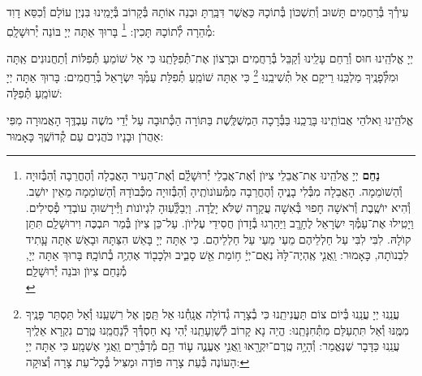 \documentclass[twoside, openany, parskip=half, 11pt]{book}
\begin{document}
עִירְ֯ךָ בְּ֯רַחֲמִים תָּשׁוּב וְ֯תִשְׁכּוֹן בְּ֯תוֹכָהּ כַּאֲשֶׁר דִּבַּֽרְתָּ וּבְנֵה אוֹתָהּ בְּ֯קָרוֹב בְּ֯יָמֵֽינוּ בִּנְיַן עוֹלָם וְ֯כִסֵּא דָוִד מְ֯הֵרָה לְ֯תוֹכָהּ תָּכִין:
\footnote{
\textbf{נַחֵם}
יְיָ אֱלֹהֵֽינוּ אֶת־אֲבֵלֵי צִיּוֺן וְ֯אֶת־אֲבֵלֵי יְ֯רוּשָׁלַֽ֔֗͏ִם וְ֯אֶת־הָעִיר הָאֲבֵלָה וְ֯הֶחֳרֵבָה וְ֯הַבְּ֯זוּיָה וְ֯הַשׁוֺמֵמָה. הָאֲבֵלָה מִבְּ֯לִי בָנֱיהָ וְ֯הֶחֳרֵבָה מִמְּ֯עוֺנוֺתֶֽיהָ וְ֯הַבְּ֯זוּיָה מִכְּ֯בוֺדָהּ וְ֯הַשׁוֺמֵמָה מֵאֵין יוֺשֵׁב. וְ֯הִיא יוֺשֶֽׁבֶת וְ֯רֹאשָׁה חָפוּי בְּ֯אִשָׁה עֲקַרָה שֶׁלֹּא יָלֳדָה. וַיְבַלְְּ֯עֽוּהָ לִגְיוֺנוֺת וַיְּ֯ירָשׁוּהָ עוֺבְדֵי פְ֯סִילִים. וַיָטִֽילוּ אֶת־עַמְּ֯ךָ יִשְׂרָאֵל לֶחָרֱֽב וַיַּהַרְגוּ בְ֯זָדוֺן חֲסִידֵי עֶלְיוֺן. עַל־כֵּן צִיּוֺן בְּ֯מַר תּבְכֶּה וִירוּשָׁלַֽ͏ִם תִּתֵּן קוֺלָהּ. לִבִּי לִבִּי עַל חַלְלֵיהֶם מֵעַי מֵעַי עַל חַלְלֵיהֶם. כִּי אַתָּה יְיָ בָּאֵשׁ הִצַּתָּהּ וּבָאֵשׁ אַתָּה עָָתִיד לִבְנוֺתָה, כָּאָמוּר: וַֽאֲנִ֤י אֶֽהְיֶה־לָּהּ֙ נְאֻם־יְיָ֔ ח֥וֹמַת אֵ֖שׁ סָבִ֑יב וּלְכָב֖וֹד אֶהְיֶ֥ה בְ֯תוֹכָֽהּ׃
בָּרוּךְ אַתָּה יְיָ, מְ֯נַחֵם צִיוֺן וּבֹנֵה יְ֯רוּשָׁלַֽ͏ִם׃ \\
}
בָּרוּךְ אַתָּה יְיָ בּוֹנֵה יְ֯רוּשָׁלָֽםִ:

\weekdaysamalchus

יְיָ אֱלֹהֵֽינוּ חוּס וְ֯רַחֵם עָלֵֽינוּ וְ֯קַבֵּל בְּ֯רַחֲמִים וּבְרָצוֹן אֶת־תְּ֯פִלָּתֵֽנוּ כִּי אֵל שׁוֹמֵעַ תְּ֯פִלּוֹת וְ֯תַחֲנוּנִים אַֽתָּה וּמִלְּ֯פָנֶֽיךָ מַלְכֵּֽנוּ רֵיקָם אַל תְּ֯שִׁיבֵֽנוּ
\footnote{
עֲנֵֽנוּ יְיָ עֲנֵֽנוּ בְּ֯יוֹם צוֹם תַּעֲנִיתֵֽנוּ כִּי בְ֯צָרָה גְ֯דוֹלָה אֲנָֽחְ֯נוּ אַל תֵּֽפֶן אֶל רִשְׁעֵֽנוּ וְ֯אַל תַּסְתֵּר פָּנֶֽיךָ מִמֶּֽנּוּ וְ֯אַל תִּתְעַלַּם מִתְּ֯חִנָּתֵֽנוּ: הֱיֵה נָא קָרוֹב לְ֯שַׁוְעָתֵֽנוּ יְ֯הִי נָא חַסְדְּ֯ךָ לְ֯נַחֲמֵֽנוּ טֶֽרֶם נִקְרָא אֵלֶֽיךָ עֲנֵֽנוּ כַּדָּבָר שֶׁנֶּאֱמַר:
וְ֯הָיָ֥ה טֶֽרֶם־יִקְרָ֖אוּ וַֽאֲנִ֣י אֶעֱנֶ֑ה ע֛וֹד הֵ֥ם מְ֯דַבְּ֯רִ֖ים וַֽאֲנִ֥י אֶשְׁמָֽע׃ כִּי אַתָּה יְיָ הָעוֹנֶה בְּ֯עֵת צָרָה פּוֹדֶה וּמַצִּיל בְּ֯כׇל־עֵת צָרָה וְ֯צוּקָה:
}
כִּי אַתָּה שׁוֹמֵֽעַ תְּ֯פִלַּת עַמְּ֯ךָ יִשְׂרָאֵל בְּ֯רַחֲמִים: בָּרוּךְ אַתָּה יְיָ שׁוֹמֵֽעַ תְּ֯פִלָּה:

\retzeh

\yaalehveyavo

\zion

\modim

\alhanisim

\weekdaysahodos

אֱלֹהֵֽינוּ וֵאלֹהֵי אֲבוֹתֵֽינוּ בָּרֲכֵֽנוּ בַּבְּ֯רָכָה הַמְשֻׁלֶּֽשֶׁת בַּתּוֹרָה
הַכְּ֯תוּבָה עַל יְ֯דֵי מֹשֶׁה עַבְדֶּֽךָ הָאֲמוּרָה מִפִּי אַהֲרֹן וּבָנָיו כֹּהֲנִים עַם קְ֯דוֹשֶֽׁךָ כָּאָמוּר:
\end{document}
